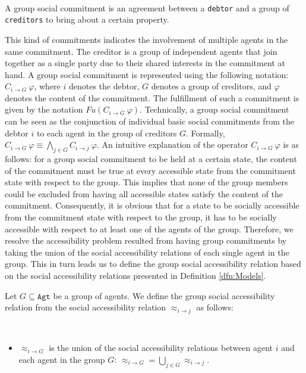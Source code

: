 \begin{definition} ~

A group social commitment is an agreement between a
\texttt{debtor} and a group of \texttt{creditors} to bring about a
certain property.
\end{definition}

This kind of commitments indicates the involvement of multiple
agents in the same commitment. The creditor is a group of
independent agents that join together as a single party due to
their shared interests in the commitment at hand. A group social
commitment is represented using the following notation: $C_{i\to
G} ~\varphi$, where $i$ denotes the debtor, $G$ denotes a group of
creditors, and $\varphi$ denotes the content of the commitment.
The fulfillment of such a commitment is given by the notation
$Fu(C_{i\to G} ~\varphi)$. Technically, a group social commitment
can be seen as the conjunction of individual basic social
commitments from the debtor $i$ to each agent in the group of
creditors $G$. Formally, $C_{i\to G} ~\varphi \equiv
\bigwedge\limits_{j\in G} C_{i\rightarrow j} ~\varphi$. An
intuitive explanation of the operator $C_{i\to G} ~\varphi$ is as
follows: for a group social commitment to be held at a certain
state, the content of the commitment must be true at every
accessible state from the commitment state with respect to the
group. This implies that none of the group members could be
excluded from having all accessible states satisfy the content of
the commitment. Consequently, it is obvious that for a state to be
socially accessible from the commitment state with respect to the
group, it has to be socially accessible with respect to at least
one of the agents of the group. Therefore, we resolve the
accessibility problem resulted from having group commitments by
taking the union of the social accessibility relations of each
single agent in the group. This in turn leads us to define the
group social accessibility relation based on the social
accessibility relations presented in Definition \ref{dfn:Models}.


Let $G\subseteq \texttt{Agt}$ be a group of agents. We define the group social accessibility relation from the social accessibility relation $\approx_{i \to j}$ as follows:
\begin{definition}  \label{dfn: group social
relations}~
%
\begin{itemize}

\item $\approx_{i \rightarrow G}$ is the union of the social accessibility relations between agent $i$ and each agent in the group $G$: $\approx_{i \to G}=\bigcup\limits_{j \in G}\approx_{i\to j}$.

\end{itemize}

\end{definition}


